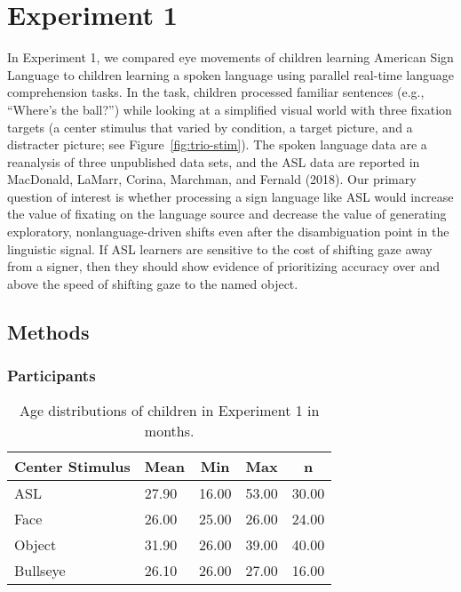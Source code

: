 \documentclass[,man,floatsintext]{apa6}
\begin{document}
\hypertarget{experiment-1}{%
\section{Experiment 1}\label{experiment-1}}

In Experiment 1, we compared eye movements of children learning American
Sign Language to children learning a spoken language using parallel
real-time language comprehension tasks. In the task, children processed
familiar sentences (e.g., \enquote{Where's the ball?}) while looking at
a simplified visual world with three fixation targets (a center stimulus
that varied by condition, a target picture, and a distracter picture;
see Figure~\ref{fig:trio-stim}). The spoken language data are a
reanalysis of three unpublished data sets, and the ASL data are reported
in MacDonald, LaMarr, Corina, Marchman, and Fernald (2018). Our primary
question of interest is whether processing a sign language like ASL
would increase the value of fixating on the language source and decrease
the value of generating exploratory, nonlanguage-driven shifts even
after the disambiguation point in the linguistic signal. If ASL learners
are sensitive to the cost of shifting gaze away from a signer, then they
should show evidence of prioritizing accuracy over and above the speed
of shifting gaze to the named object.

\hypertarget{methods}{%
\subsection{Methods}\label{methods}}

\hypertarget{participants}{%
\subsubsection{Participants}\label{participants}}

\begin{table}[tbp]
\begin{center}
\begin{threeparttable}
\caption{\label{tab:trio make participants table}Age distributions of children in Experiment 1 in months.}
\begin{tabular}{lllll}
\toprule
Center Stimulus & \multicolumn{1}{c}{Mean} & \multicolumn{1}{c}{Min} & \multicolumn{1}{c}{Max} & \multicolumn{1}{c}{n}\\
\midrule
ASL & 27.90 & 16.00 & 53.00 & 30.00\\
Face & 26.00 & 25.00 & 26.00 & 24.00\\
Object & 31.90 & 26.00 & 39.00 & 40.00\\
Bullseye & 26.10 & 26.00 & 27.00 & 16.00\\
\bottomrule
\end{tabular}
\end{threeparttable}
\end{center}
\end{table}
\end{document}
